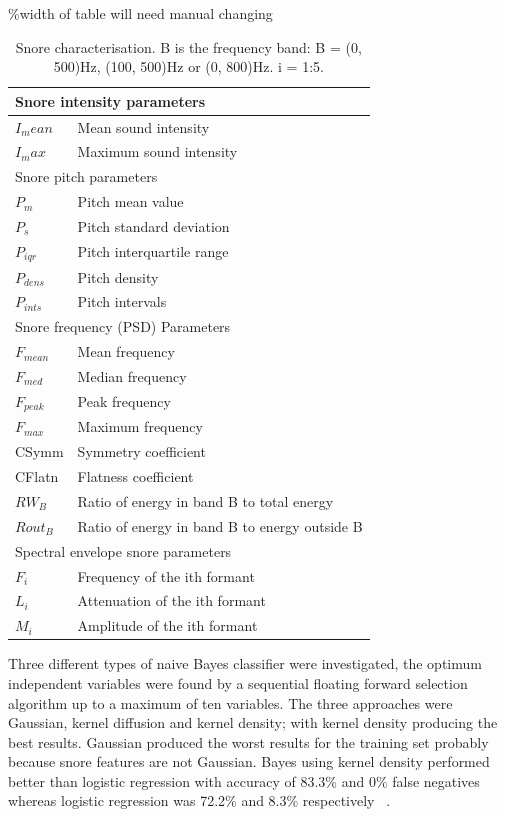 \begin{table}[h]
\%width of table will need manual changing
\centering
\begin{tabular}{l l}
\toprule
\multicolumn{2}{l}{Snore intensity parameters}\\ \midrule
$I_mean$&Mean sound intensity\\ 
$I_max$&Maximum sound intensity\\ 
\multicolumn{2}{l}{Snore pitch parameters}\\ 
$P_{m}$&Pitch mean value\\ 
$P_{s}$&Pitch standard deviation\\ 
$P_{iqr}$&Pitch interquartile range\\ 
$P_{dens}$&Pitch density\\ 
$P_{ints}$&Pitch intervals\\ 
\multicolumn{2}{l}{Snore frequency (PSD) Parameters}\\ 
$F_{mean}$&Mean frequency\\ 
$F_{med}$&Median frequency\\ 
$F_{peak}$&Peak frequency\\ 
$F_{max}$&Maximum frequency\\ 
CSymm&Symmetry coefficient\\ 
CFlatn&Flatness coefficient\\ 
$RW_{B}$&Ratio of energy in band B to total energy\\ 
$Rout_{B}$&Ratio of energy in band B to energy outside B\\ 
\multicolumn{2}{l}{Spectral envelope snore parameters}\\ 
$F_{i}$&Frequency of the ith formant\\ 
$L_{i}$&Attenuation of the ith formant\\ 
$M_{i}$&Amplitude of the ith formant\\ \bottomrule
\end{tabular}
\caption{Snore characterisation. B is the frequency band: B = (0, 500)Hz, (100, 500)Hz or (0, 800)Hz. i = 1:5.}
\label{table:sola2012}
\end{table}
Three different types of naive Bayes classifier were investigated, the optimum independent variables were found by a sequential floating forward selection algorithm up to a maximum of ten variables. The three approaches were Gaussian, kernel diffusion and kernel density; with kernel density producing the best results. Gaussian produced the worst results for the training set probably because snore features are not Gaussian. Bayes using kernel density performed better than logistic regression with accuracy of 83.3\% and 0\% false negatives whereas logistic regression was 72.2\% and 8.3\% respectively ~\cite{sola2012multiclass}.
